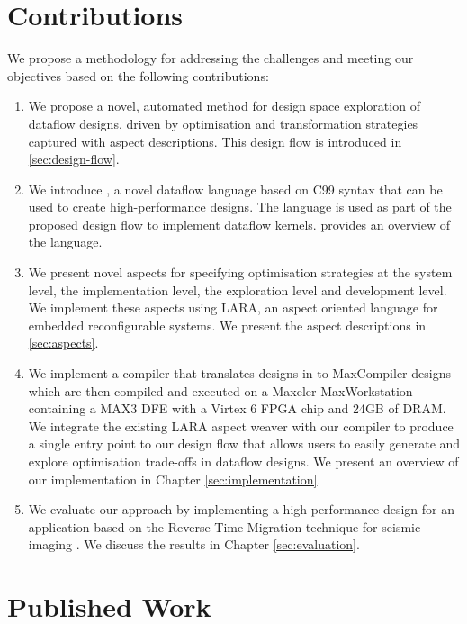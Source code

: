 \section{Contributions}


We propose a methodology for addressing the challenges and meeting our
objectives based on the following contributions:

\begin{enumerate}

\item We propose a novel, automated method for design space
  exploration of dataflow designs, driven by optimisation and
  transformation strategies captured with aspect descriptions. This
  design flow is introduced in \cref{sec:design-flow}.

\item We introduce \FAST{}, a novel dataflow language based on C99
  syntax that can be used to create high-performance designs. The
  language is used as part of the proposed design flow to implement
  dataflow kernels.  provides an overview of the
  \FAST{} language.

\item We present novel aspects for specifying optimisation strategies
  at the system level, the implementation level, the exploration level
  and development level. We implement these aspects using
  LARA, an
  aspect oriented language for embedded reconfigurable systems. We present
  the aspect descriptions in \cref{sec:aspects}.

\item We implement a compiler that translates designs in \FAST{} to
  MaxCompiler designs which are then compiled and
  executed on a Maxeler MaxWorkstation containing a MAX3 DFE with a
  Virtex 6 FPGA chip and 24GB of DRAM.  We integrate the existing LARA
  aspect weaver with our compiler to produce a single entry point to
  our design flow that allows users to easily generate and explore
  optimisation trade-offs in dataflow designs. We present an overview
  of our implementation in Chapter \ref{sec:implementation}.

\item We evaluate our approach by implementing a high-performance
  design for an application based on the Reverse Time Migration
  technique for seismic imaging
  \cite{Xinyu:Qiwei:Luk:Qiang:Pell:2012}. We discuss the results in
  Chapter \ref{sec:evaluation}.
\end{enumerate}

\section{Published Work}

